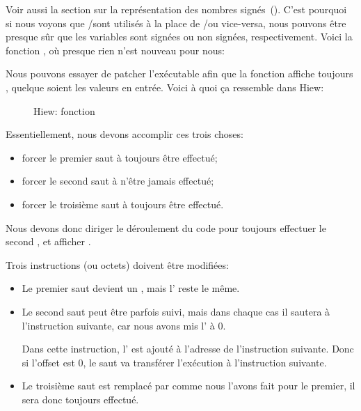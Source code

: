 Voir aussi la section sur la représentation des nombres signés~().
C'est pourquoi si nous voyons que \JG/\JL sont utilisés à la place de \JA/\JB ou
vice-versa, nous pouvons être presque sûr que les variables sont signées ou non
signées, respectivement.
Voici la fonction \main, où presque rien n'est nouveau pour nous:





\clearpage
{}

Nous pouvons essayer de patcher l'exécutable afin que la fonction 
affiche toujours , quelque soient les valeurs en entrée.
Voici à quoi ça ressemble dans Hiew:

\begin{figure}[H]
\centering
{}
\caption{Hiew: fonction }
\label{fig:jcc_hiew_1}
\end{figure}

Essentiellement, nous devons accomplir ces trois choses:
\begin{itemize}
\item forcer le premier saut à toujours être effectué;
\item forcer le second saut à n'être jamais effectué;
\item forcer le troisième saut à toujours être effectué.
\end{itemize}

Nous devons donc diriger le déroulement du code pour toujours effectuer le second \printf,
et afficher .

Trois instructions (ou octets) doivent être modifiées:

\begin{itemize}
\item Le premier saut devient un \JMP, mais l' reste
le même.

\item
Le second saut peut être parfois suivi, mais dans chaque cas il sautera à l'instruction
suivante, car nous avons mis l' à 0.

Dans cette instruction, l' est ajouté à l'adresse
de l'instruction suivante. Donc si l'offset est 0, le saut va transférer l'exécution
à l'instruction suivante.

\item
Le troisième saut est remplacé par \JMP comme nous l'avons fait pour le premier,
il sera donc toujours effectué.

\end{itemize}

